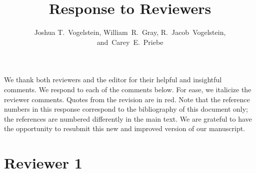 \documentclass[11pt]{article}
\title{Response to Reviewers}
\author{Joshua T.~Vogelstein,
		William~R.~Gray,
        R.~Jacob~Vogelstein,
        and~Carey~E.~Priebe}
\begin{document}
\maketitle


We thank both reviewers and the editor for their helpful and insightful comments.  We respond to each of the comments below. For ease, we italicize the reviewer comments.  Quotes from the revision are in red. Note that the reference numbers in this response correspond to the bibliography of this document only; the references are numbered differently in the main text. We are grateful to have the opportunity to resubmit this new and improved version of our manuscript.


\section{Reviewer 1}
\end{document}
